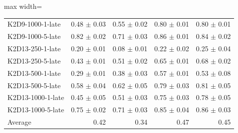 \documentclass{article}
\begin{document}
\begin{table}[ht]
\begin{center}
\begin{small}
\begin{adjustbox}{max width=\columnwidth}
\begin{tabular}{l|rrrr}
K2D9-1000-1-late & 0.48 $\pm$ 0.03 & 0.55 $\pm$ 0.02 & 0.80 $\pm$ 0.01 & 0.80 $\pm$ 0.01\\
K2D9-1000-5-late & 0.82 $\pm$ 0.02 & 0.71 $\pm$ 0.03 & 0.86 $\pm$ 0.01 & 0.84 $\pm$ 0.02\\
K2D13-250-1-late & 0.20 $\pm$ 0.01 & 0.08 $\pm$ 0.01 & 0.22 $\pm$ 0.02 & 0.25 $\pm$ 0.04\\
K2D13-250-5-late & 0.43 $\pm$ 0.01 & 0.51 $\pm$ 0.02 & 0.65 $\pm$ 0.01 & 0.68 $\pm$ 0.02\\
K2D13-500-1-late & 0.29 $\pm$ 0.01 & 0.38 $\pm$ 0.03 & 0.57 $\pm$ 0.01 & 0.53 $\pm$ 0.08\\
K2D13-500-5-late & 0.58 $\pm$ 0.04 & 0.62 $\pm$ 0.05 & 0.79 $\pm$ 0.03 & 0.81 $\pm$ 0.05\\
K2D13-1000-1-late & 0.45 $\pm$ 0.05 & 0.51 $\pm$ 0.03 & 0.75 $\pm$ 0.03 & 0.78 $\pm$ 0.05\\
K2D13-1000-5-late & 0.75 $\pm$ 0.02 & 0.71 $\pm$ 0.03 & 0.85 $\pm$ 0.04 & 0.86 $\pm$ 0.03\\
\midrule
Average & 0.42 & 0.34 & 0.47 & 0.45\\
\end{tabular}
        \end{adjustbox}
    \end{small}
    \end{center}
    \vskip -0.1in
\end{table}
\end{document}
